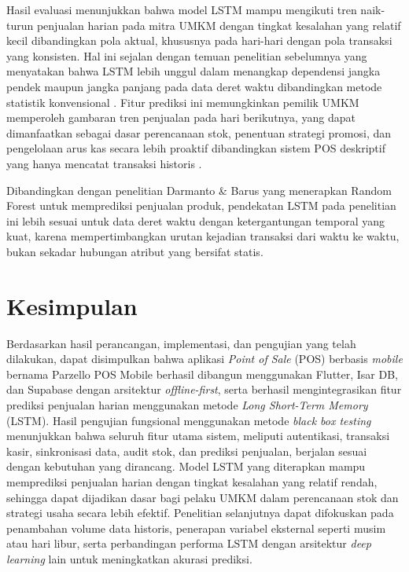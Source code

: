 \documentclass[a4paper,10pt,onecolumn]{article}
\begin{document}
Hasil evaluasi menunjukkan bahwa model LSTM mampu mengikuti tren naik-turun penjualan harian pada mitra UMKM dengan tingkat kesalahan yang relatif kecil dibandingkan pola aktual, khususnya pada hari-hari dengan pola transaksi yang konsisten. Hal ini sejalan dengan temuan penelitian sebelumnya yang menyatakan bahwa LSTM lebih unggul dalam menangkap dependensi jangka pendek maupun jangka panjang pada data deret waktu dibandingkan metode statistik konvensional \cite{Prasetyo2023, Ramadhan2022}. Fitur prediksi ini memungkinkan pemilik UMKM memperoleh gambaran tren penjualan pada hari berikutnya, yang dapat dimanfaatkan sebagai dasar perencanaan stok, penentuan strategi promosi, dan pengelolaan arus kas secara lebih proaktif dibandingkan sistem POS deskriptif yang hanya mencatat transaksi historis \cite{Wijaya2022}.

Dibandingkan dengan penelitian Darmanto \& Barus \cite{Darmanto2024} yang menerapkan Random Forest untuk memprediksi penjualan produk, pendekatan LSTM pada penelitian ini lebih sesuai untuk data deret waktu dengan ketergantungan temporal yang kuat, karena mempertimbangkan urutan kejadian transaksi dari waktu ke waktu, bukan sekadar hubungan atribut yang bersifat statis.

\section{Kesimpulan}

Berdasarkan hasil perancangan, implementasi, dan pengujian yang telah dilakukan, dapat disimpulkan bahwa aplikasi \textit{Point of Sale} (POS) berbasis \textit{mobile} bernama Parzello POS Mobile berhasil dibangun menggunakan Flutter, Isar DB, dan Supabase dengan arsitektur \textit{offline-first}, serta berhasil mengintegrasikan fitur prediksi penjualan harian menggunakan metode \textit{Long Short-Term Memory} (LSTM). Hasil pengujian fungsional menggunakan metode \textit{black box testing} menunjukkan bahwa seluruh fitur utama sistem, meliputi autentikasi, transaksi kasir, sinkronisasi data, audit stok, dan prediksi penjualan, berjalan sesuai dengan kebutuhan yang dirancang. Model LSTM yang diterapkan mampu memprediksi penjualan harian dengan tingkat kesalahan yang relatif rendah, sehingga dapat dijadikan dasar bagi pelaku UMKM dalam perencanaan stok dan strategi usaha secara lebih efektif. Penelitian selanjutnya dapat difokuskan pada penambahan volume data historis, penerapan variabel eksternal seperti musim atau hari libur, serta perbandingan performa LSTM dengan arsitektur \textit{deep learning} lain untuk meningkatkan akurasi prediksi.
\end{document}
